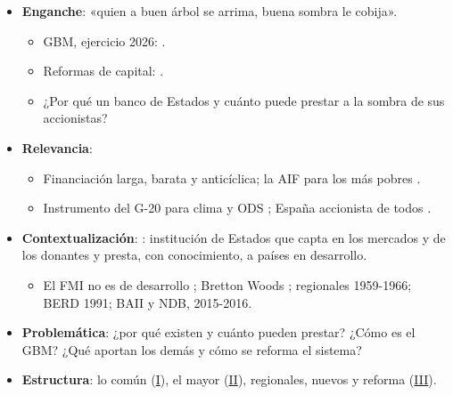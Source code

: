 \documentclass{article}
\begin{document}
\cabecerarepaso
\begin{columnas}

\begin{itemize}
\item \textbf{Enganche}: «quien a buen árbol se arrima, buena sombra le cobija».
  \begin{itemize}
  \item GBM, ejercicio 2026: .
  \item Reformas de capital: .
  \item ¿Por qué un banco de Estados y cuánto puede prestar a la sombra de sus accionistas?
  \end{itemize}
\item \textbf{Relevancia}:
  \begin{itemize}
  \item Financiación larga, barata y anticíclica; la AIF para los más pobres .
  \item Instrumento del G-20 para clima y ODS ; España accionista de todos .
  \end{itemize}
\item \textbf{Contextualización}: : institución de Estados que capta en los mercados y de los donantes y presta, con conocimiento, a países en desarrollo.
  \begin{itemize}
  \item El FMI no es de desarrollo ; Bretton Woods ; regionales 1959-1966; BERD 1991; BAII y NDB, 2015-2016.
  \end{itemize}
\item \textbf{Problemática}: ¿por qué existen y cuánto pueden prestar? ¿Cómo es el GBM? ¿Qué aportan los demás y cómo se reforma el sistema?
\item \textbf{Estructura}: lo común (\hyperref[rep:I]{I}), el mayor (\hyperref[rep:II]{II}), regionales, nuevos y reforma (\hyperref[rep:III]{III}).
\end{itemize}


\end{columnas}
\end{document}

